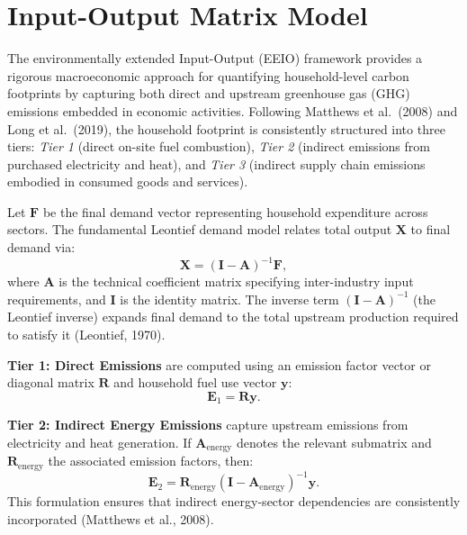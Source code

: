 \documentclass[12pt,a4paper]{article}%
\begin{document}
\section{Input-Output Matrix Model}

The environmentally extended Input-Output (EEIO) framework provides a rigorous macroeconomic approach for quantifying household-level carbon footprints by capturing both direct and upstream greenhouse gas (GHG) emissions embedded in economic activities. Following Matthews et al.\ (2008) and Long et al.\ (2019), the household footprint is consistently structured into three tiers: \textit{Tier 1} (direct on-site fuel combustion), \textit{Tier 2} (indirect emissions from purchased electricity and heat), and \textit{Tier 3} (indirect supply chain emissions embodied in consumed goods and services).

Let \( \mathbf{F} \) be the final demand vector representing household expenditure across sectors. The fundamental Leontief demand model relates total output \( \mathbf{X} \) to final demand via:
\begin{equation}
    \mathbf{X} = (\mathbf{I} - \mathbf{A})^{-1} \mathbf{F},
\end{equation}
where \( \mathbf{A} \) is the technical coefficient matrix specifying inter-industry input requirements, and \( \mathbf{I} \) is the identity matrix. The inverse term \( (\mathbf{I} - \mathbf{A})^{-1} \) (the Leontief inverse) expands final demand to the total upstream production required to satisfy it (Leontief, 1970).

\textbf{Tier 1: Direct Emissions} are computed using an emission factor vector or diagonal matrix \( \mathbf{R} \) and household fuel use vector \( \mathbf{y} \):
\begin{equation}
    \mathbf{E}_1 = \mathbf{R} \mathbf{y}.
\end{equation}

\textbf{Tier 2: Indirect Energy Emissions} capture upstream emissions from electricity and heat generation. If \( \mathbf{A}_{\text{energy}} \) denotes the relevant submatrix and \( \mathbf{R}_{\text{energy}} \) the associated emission factors, then:
\begin{equation}
    \mathbf{E}_2 = \mathbf{R}_{\text{energy}} (\mathbf{I} - \mathbf{A}_{\text{energy}})^{-1} \mathbf{y}.
\end{equation}
This formulation ensures that indirect energy-sector dependencies are consistently incorporated (Matthews et al., 2008).
\end{document}

